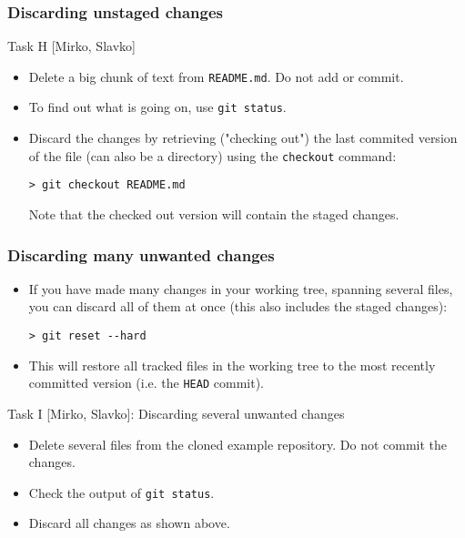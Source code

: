 \begin{frame}[fragile]
	\frametitle{Discarding unstaged changes}
	
	\begin{block}{Task H [Mirko, Slavko]}
	\begin{itemize}
	\item Delete a big chunk of text from \texttt{README.md}. Do not add or commit.
	
	\item To find out what is going on, use \texttt{git status}.
	\medskip	
    \item Discard the changes by retrieving ("checking out") the last commited version of the file (can also be a directory) using the \texttt{checkout} command:

	\begin{verbatim}
> git checkout README.md
	\end{verbatim}
	
	Note that the checked out version will contain the staged changes.
	\end{itemize}	
	\end{block}
\end{frame}
\begin{frame}[fragile]

\frametitle{Discarding many unwanted changes}

	\begin{itemize}
	\item If you have made many changes in your working tree, spanning several files, you can discard all of them at once (this also includes the staged changes): 
	\begin{verbatim}
> git reset --hard
	\end{verbatim}
 
	\item This will restore all tracked files in the working tree to the most recently committed version (i.e. the \texttt{HEAD} commit).
	\end{itemize}

\begin{block}{Task I [Mirko, Slavko]: Discarding several unwanted changes}
	\begin{itemize}
	\item Delete several files from the cloned example repository. Do not commit the changes.
	\item Check the output of \texttt{git status}.
	\item Discard all changes as shown above.
	\end{itemize}
\end{block}

\end{frame}

